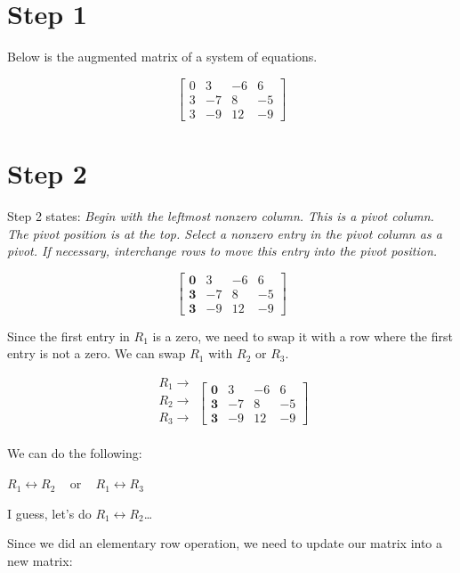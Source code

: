 \documentclass[
  letterpaper,
  DIV=11,
  numbers=noendperiod]{scrreprt}
\begin{document}
\chapter{Step 1}

Below is the augmented matrix of a system of equations.

\[
\begin{bmatrix}
    0 & 3 & -6 & 6 \\
    3 & -7 & 8 & -5 \\
    3 & -9 & 12 & -9
\end{bmatrix}
\]

\chapter{Step 2}

Step 2 states: \emph{Begin with the leftmost nonzero column. This is a
pivot column. The pivot position is at the top. Select a nonzero entry
in the pivot column as a pivot. If necessary, interchange rows to move
this entry into the pivot position.}

\[
\begin{bmatrix}
    \mathbf{0} & 3 & -6 & 6 \\
    \mathbf{3} & -7 & 8 & -5 \\
    \mathbf{3} & -9 & 12 & -9
\end{bmatrix}
\]

Since the first entry in \(R_1\) is a zero, we need to swap it with a
row where the first entry is not a zero. We can swap \(R_1\) with
\(R_2\) or \(R_3\).

\[
\begin{array}{c}
     R_1 \rightarrow \\
     R_2 \rightarrow \\
     R_3 \rightarrow \\
\end{array}
\left[\begin{array}{ccc}
    \mathbf{0} & 3 & -6 & 6 \\
    \mathbf{3} & -7 & 8 & -5 \\
    \mathbf{3} & -9 & 12 & -9
\end{array}\right]
\]

We can do the following:

\(R_1 \leftrightarrow R_2 \;\;\;\) or \(\;\;\;R_1 \leftrightarrow R_3\)

I guess, let's do \(R_1 \leftrightarrow R_2\)\ldots{}

Since we did an elementary row operation, we need to update our matrix
into a new matrix:
\end{document}

